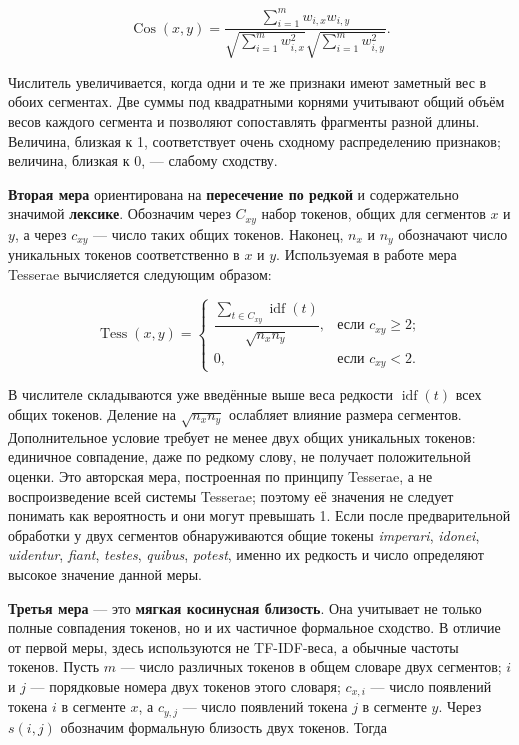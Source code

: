 \begin{equation}
\operatorname{Cos}(x,y)=
\frac{\displaystyle\sum_{i=1}^{m}w_{i,x}w_{i,y}}
{\displaystyle
\sqrt{\sum_{i=1}^{m}w_{i,x}^{2}}
\sqrt{\sum_{i=1}^{m}w_{i,y}^{2}}}.
\end{equation}

Числитель увеличивается, когда одни и те же признаки имеют заметный вес в обоих сегментах. Две суммы под квадратными корнями учитывают общий объём весов каждого сегмента и позволяют сопоставлять фрагменты разной длины. Величина, близкая к 1, соответствует очень сходному распределению признаков; величина, близкая к 0, --- слабому сходству.

\textbf{Вторая мера} ориентирована на \textbf{пересечение по редкой} и содержательно значимой \textbf{лексике}. Обозначим через $C_{xy}$ набор токенов, общих для сегментов $x$ и $y$, а через $c_{xy}$ --- число таких общих токенов. Наконец, $n_x$ и $n_y$ обозначают число уникальных токенов соответственно в $x$ и $y$. Используемая в работе мера Tesserae вычисляется следующим образом:

\begin{equation}
\operatorname{Tess}(x,y)=
\begin{cases}
\dfrac{\displaystyle\sum_{t\in C_{xy}}\operatorname{idf}(t)}
{\sqrt{n_xn_y}}, & \text{если }c_{xy}\geq2;\\[8pt]
0, & \text{если }c_{xy}<2.
\end{cases}
\end{equation}

В числителе складываются уже введённые выше веса редкости $\operatorname{idf}(t)$ всех общих токенов. Деление на $\sqrt{n_xn_y}$ ослабляет влияние размера сегментов. Дополнительное условие требует не менее двух общих уникальных токенов: единичное совпадение, даже по редкому слову, не получает положительной оценки. Это авторская мера, построенная по принципу Tesserae, а не воспроизведение всей системы Tesserae; поэтому её значения не следует понимать как вероятность и они могут превышать 1. Если после предварительной обработки у двух сегментов обнаруживаются общие токены \emph{imperari}, \emph{idonei}, \emph{uidentur}, \emph{fiant}, \emph{testes}, \emph{quibus}, \emph{potest}, именно их редкость и число определяют высокое значение данной меры.

\textbf{Третья мера} --- это \textbf{мягкая косинусная близость}. Она учитывает не только полные совпадения токенов, но и их частичное формальное сходство. В отличие от первой меры, здесь используются не TF-IDF-веса, а обычные частоты токенов. Пусть $m$ --- число различных токенов в общем словаре двух сегментов; $i$ и $j$ --- порядковые номера двух токенов этого словаря; $c_{x,i}$ --- число появлений токена $i$ в сегменте $x$, а $c_{y,j}$ --- число появлений токена $j$ в сегменте $y$. Через $s(i,j)$ обозначим формальную близость двух токенов. Тогда

